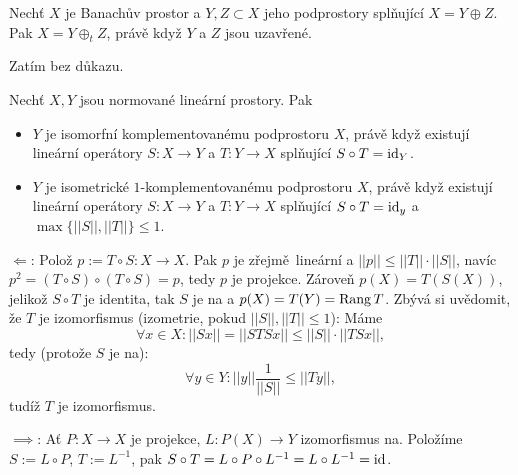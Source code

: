 \documentclass[12pt]{article}					%
\begin{document}
\begin{veta}
	Nechť $X$ je Banachův prostor a $Y, Z \subset X$ jeho podprostory splňující $X = Y \oplus Z$. Pak $X = Y \oplus_t Z$, právě když $Y$ a $Z$ jsou uzavřené.

	\begin{dukazin}
		Zatím bez důkazu.
	\end{dukazin}
\end{veta}

\begin{veta}
	Nechť $X, Y$ jsou normované lineární prostory. Pak

	\begin{itemize}
		\item $Y$ je isomorfní komplementovanému podprostoru $X$, právě když existují lineární operátory $S: X \rightarrow Y$ a $T: Y \rightarrow X$ splňující $S \circ T = \operatorname{id}_Y$.
		\item $Y$ je isometrické $1$-komplementovanému podprostoru $X$, právě když existují lineární operátory $S: X \rightarrow Y$ a $T: Y \rightarrow X$ splňující $S \circ T = \operatorname{id}_y$ a $\max\{||S||, ||T||\} ≤ 1$.
	\end{itemize}

	\begin{dukazin}
		$\Leftarrow$: Polož $p := T \circ S: X \rightarrow X$. Pak $p$ je zřejmě lineární a $||p|| ≤ ||T||·||S||$, navíc $p^2 = (T\circ S)\circ(T \circ S) = p$, tedy $p$ je projekce. Zároveň $p(X) = T(S(X))$, jelikož $S \circ T$ je identita, tak $S$ je na a $p(X) = T(Y) = \operatorname{Rang} T$. Zbývá si uvědomit, že $T$ je izomorfismus (izometrie, pokud $||S||, ||T|| ≤ 1$): Máme
		$$ \forall x \in X: ||S x|| = ||STS x|| ≤ ||S||·||TS x||, $$
		tedy (protože $S$ je na):
		$$ \forall y \in Y: ||y||\frac{1}{||S||} ≤ ||Ty||, $$
		tudíž $T$ je izomorfismus.

		$\implies$: Ať $P: X \rightarrow X$ je projekce, $L: P(X) \rightarrow Y$ izomorfismus na. Položíme $S := L \circ P$, $T := L^{-1}$, pak $S \circ T = L \circ P \circ L^{-1} = L \circ L^{-1} = \operatorname{id}$.
	\end{dukazin}
\end{veta}
\end{document}
